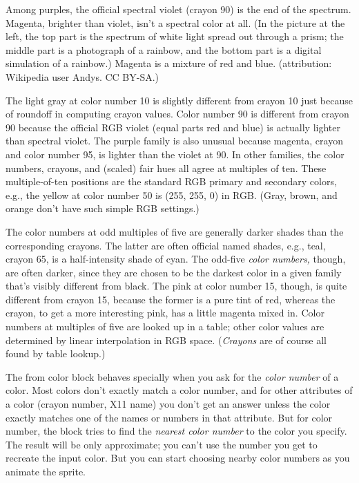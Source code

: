 Among purples, the official spectral violet (crayon 90) is the end of
the spectrum. Magenta, brighter than violet, isn't a spectral color at
all. \label{rainbow}{}(In the picture at the left, the
top part is the spectrum of white light spread out through a prism; the
middle part is a photograph of a rainbow, and the bottom part is a
digital simulation of a rainbow.) Magenta is a mixture of red and blue.
(attribution: Wikipedia user Andys. CC BY-SA.)

The light gray at color number 10 is slightly different from crayon 10
just because of roundoff in computing crayon values. Color number 90 is
different from crayon 90 because the official RGB violet (equal parts
red and blue) is actually lighter than spectral violet. The purple
family is also unusual because magenta, crayon and color number 95, is
lighter than the violet at 90. In other families, the color numbers,
crayons, and (scaled) fair hues all agree at multiples of ten. These
multiple-of-ten positions are the standard RGB primary and secondary
colors, e.g., the yellow at color number 50 is (255, 255, 0) in RGB.
(Gray, brown, and orange don't have such simple RGB settings.)

The color numbers at odd multiples of five are generally darker shades
than the corresponding crayons. The latter are often official named
shades, e.g., teal, crayon 65, is a half-intensity shade of cyan. The
odd-five \emph{color numbers,} though, are often darker, since they are
chosen to be the darkest color in a given family that's visibly
different from black. The pink at color number 15, though, is quite
different from crayon 15, because the former is a pure tint of red,
whereas the crayon, to get a more interesting pink, has a little magenta
mixed in. Color numbers at multiples of five are looked up in a table;
other color values are determined by linear interpolation in RGB space.
(\emph{Crayons} are of course all found by table lookup.)

The from color block behaves specially when you ask for the \emph{color
number} of a color. Most colors don't exactly match a color number, and
for other attributes of a color (crayon number, X11 name) you don't get
an answer unless the color exactly matches one of the names or numbers
in that attribute. But for color number, the block tries to find the
\emph{nearest color number} to the color you specify. The result will be
only approximate; you can't use the number you get to recreate the input
color. But you can start choosing nearby color numbers as you animate
the sprite.

